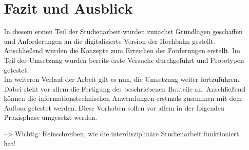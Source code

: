 %
%
%
%
%
%
%
%
%	




\chapter{Fazit und Ausblick}
In diesem ersten Teil der Studienarbeit wurden zunächst Grundlagen geschaffen und Anforderungen an die digitalisierte Version der Hochbahn gestellt. Anschließend wurden die Konzepte zum Erreichen der Forderungen erstellt. Im Teil der Umsetzung wurden bereits erste Versuche durchgeführt und Prototypen getestet.\\

Im weiteren Verlauf der Arbeit gilt es nun, die Umsetzung weiter fortzuführen. Dabei steht vor allem die Fertigung der beschriebenen Bauteile an. Anschließend können die informationstechnischen Anwendungen erstmals zusammen mit dem Aufbau getestet werden. Diese Vorhaben sollen vor allem in der folgenden Praxisphase umgesetzt werden. 

--> Wichtig: Reinschreiben, wie die interdisziplinäre Studienarbeit funktioniert hat!